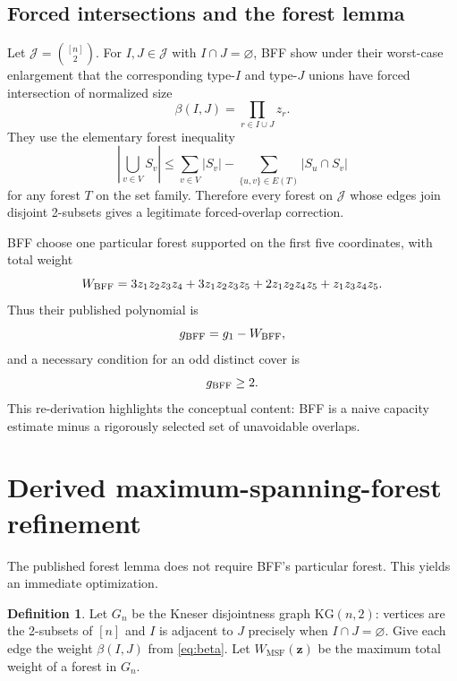 \documentclass[11pt]{article}
\theoremstyle{definition}
\newtheorem{definition}[theorem]{Definition}
\newcommand{\kg}{\mathrm{KG}}
\newcommand{\MSF}{\mathrm{MSF}}
\begin{document}
\subsection{Forced intersections and the forest lemma}

Let $\mathcal J=\binom{[n]}2$.  For $I,J\in\mathcal J$ with $I\cap J=\varnothing$, BFF show
under their worst-case enlargement that the corresponding type-$I$ and type-$J$ unions have
forced intersection of normalized size
\begin{equation}\label{eq:beta}
 \beta(I,J)=\prod_{r\in I\cup J}z_r.
\end{equation}
They use the elementary forest inequality
\[
 \left|\bigcup_{v\in V}S_v\right|
 \le \sum_{v\in V}|S_v|-
 \sum_{\{u,v\}\in E(T)}|S_u\cap S_v|
\]
for any forest $T$ on the set family.  Therefore every forest on $\mathcal J$ whose edges join
disjoint 2-subsets gives a legitimate forced-overlap correction.

BFF choose one particular forest supported on the first five coordinates, with total weight
\begin{equation}\label{eq:wbff}
 W_{\rm BFF}
 =3z_1z_2z_3z_4+3z_1z_2z_3z_5
  +2z_1z_2z_4z_5+z_1z_3z_4z_5.
\end{equation}
Thus their published polynomial is
\begin{equation}\label{eq:gbff}
 g_{\rm BFF}=g_1-W_{\rm BFF},
\end{equation}
and a necessary condition for an odd distinct cover is
\begin{equation}\label{eq:bffcondition}
 g_{\rm BFF}\ge2.
\end{equation}
This re-derivation highlights the conceptual content: BFF is a naive capacity estimate minus a
rigorously selected set of unavoidable overlaps.

\section{Derived maximum-spanning-forest refinement}

The published forest lemma does not require BFF's particular forest.  This yields an immediate
optimization.

\begin{definition}
Let $G_n$ be the Kneser disjointness graph $\kg(n,2)$: vertices are the 2-subsets of $[n]$ and
$I$ is adjacent to $J$ precisely when $I\cap J=\varnothing$.  Give each edge the weight
$\beta(I,J)$ from \eqref{eq:beta}.  Let $W_{\MSF}(\mathbf z)$ be the maximum total weight of a
forest in $G_n$.
\end{definition}
\end{document}
